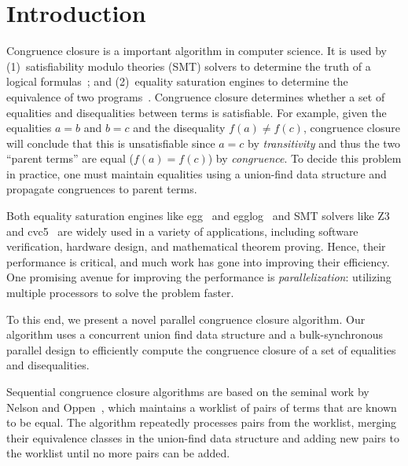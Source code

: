 \section{Introduction}
\label{sec:introduction}


Congruence closure is a important algorithm in computer science. It is used by
(1)~satisfiability modulo theories (SMT) solvers to determine the truth of a
logical formulas~\cite{smt}; and (2)~equality saturation engines to determine
the equivalence of two programs~\cite{eqsat}. Congruence closure determines
whether a set of equalities and disequalities between terms is satisfiable. For
example, given the equalities $a = b$ and $b = c$ and the disequality $f(a) \neq
f(c)$, congruence closure will conclude that this is unsatisfiable since $a = c$
by \emph{transitivity} and thus the two ``parent terms'' are equal ($f(a) =
f(c)$) by \emph{congruence}. To decide this problem in practice, one must
maintain equalities using a union-find data structure and propagate congruences
to parent terms.



Both equality saturation engines like egg~\cite{egg} and egglog~\cite{egglog} and SMT solvers like
Z3~\cite{z3} and cvc5~\cite{cvc5} are widely used in a variety of applications,
including software verification, hardware design, and mathematical theorem
proving. Hence, their performance is critical, and much work has gone into
improving their efficiency. One promising avenue for improving the performance
is \emph{parallelization}: utilizing multiple processors to
solve the problem faster. 

To this end, we present a novel parallel congruence closure algorithm. Our
algorithm uses a concurrent union find data structure and a bulk-synchronous
parallel design to efficiently compute the congruence closure of a set of
equalities and disequalities.


Sequential congruence closure algorithms are based on the seminal work by Nelson
and Oppen~\cite{nelson-oppen-cc}, which maintains a worklist of pairs of terms
that are known to be equal. The algorithm repeatedly processes pairs from the
worklist, merging their equivalence classes in the union-find data structure and
adding new pairs to the worklist until no more pairs can be added.

